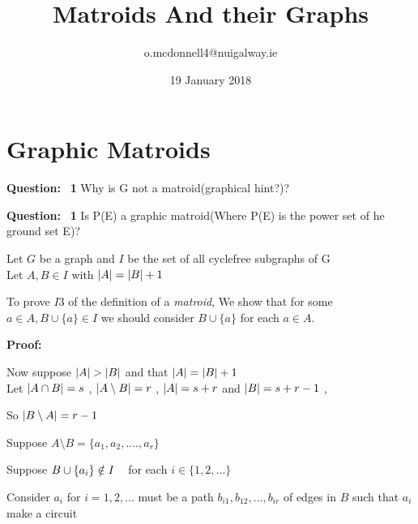 \documentclass{article}
\title{Matroids And their Graphs}
\author{o.mcdonnell4@nuigalway.ie }
\date{19 January 2018}
\theoremstyle{plain}
\theoremstyle{definition}
\theoremstyle{remark}
\newcounter{Question}
\newcommand\Question{%
    \textbf{Question:}~%
    \setcounter{Question}{0}%
}
\newcommand\Proof{%
    \textbf{Proof:}~%
}
\begin{document}
\maketitle
 
 \section{Graphic Matroids}
 
 \noindent\Question \textbf{1}
 Why is G not a matroid(graphical hint?)?
 
 \vspace{2mm}
 
 \noindent\Question \textbf{1}
 Is P(E) a graphic matroid(Where P(E) is the power set of he ground set E)?
 
 \vspace{5mm}
 
 \noindent Let $G$ be a graph and $I$ be the set of all cyclefree subgraphs of G\\
 Let $ A ,B  \in  I $ with $ \abs{A}  =  \abs{B}  + 1 $
 
 \vspace{3mm}
 
 \noindent To prove $ I3 $ of the definition of a \textit{matroid}, We show that for some $ a \in A , B \cup \{a \} \in I $  we should consider $ B \cup \{a \} $ for each $ a \in A $. 
 
 \vspace{3mm}
 
 \noindent\Proof
 
 \noindent Now suppose $ \abs{A}  >  \abs{B} $ and that $\abs{A}  =  \abs{B} + 1$\\
 Let 
 $ \abs{A \cap B} = s $ , $\abs{A \setminus B} = r$ ,
 $ \abs{A} = s + r $ and $ \abs{B} = s + r - 1$ ,
 
\noindent So $ \abs{B \setminus A} = r - 1$
 
 \vspace{3mm}
 
 \noindent Suppose $ A \setminus B = \{ a_1, a_2, .... , a_r \} $ 
 
 \noindent Suppose $ B \cup \{ a_i \} \notin I \hspace{3mm} $ for each $ i \in \{ 1,2,... \}$
 
 \vspace{2mm}
 
 \noindent Consider $ a_i $ for $ i = 1, 2,... $ must be a path $ b_{i1}, b_{12}, ... , b_{ir} $ of edges in $B$ such that $ a_i $ make a circuit
 
\end{document}
